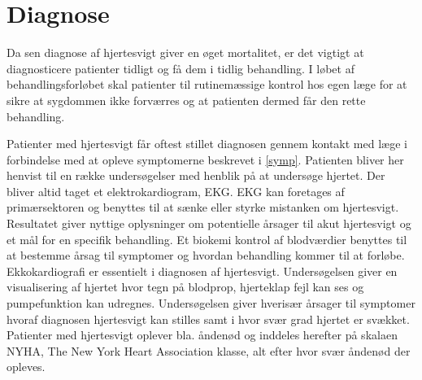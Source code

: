 

\section{Diagnose}
Da sen diagnose af hjertesvigt giver en øget mortalitet, er det vigtigt at diagnosticere patienter tidligt og få dem i tidlig behandling. I løbet af behandlingsforløbet skal patienter til rutinemæssige kontrol hos egen læge for at sikre at sygdommen ikke forværres og at patienten dermed får den rette behandling. \cite{heartfailure}

Patienter med hjertesvigt får oftest stillet diagnosen gennem kontakt med læge i forbindelse med at opleve symptomerne beskrevet i \autoref{symp}. Patienten bliver her henvist til en række undersøgelser med henblik på at undersøge hjertet. \cite{heartfailure}
Der bliver altid taget et elektrokardiogram, EKG. EKG kan foretages af primærsektoren og benyttes til at sænke eller styrke mistanken om hjertesvigt. Resultatet giver nyttige oplysninger om potentielle årsager til akut hjertesvigt og et mål for en specifik behandling. Et biokemi kontrol af blodværdier benyttes til at bestemme årsag til symptomer og hvordan behandling kommer til at forløbe. \cite{DCS}
Ekkokardiografi er essentielt i diagnosen af hjertesvigt. Undersøgelsen giver en visualisering af hjertet hvor tegn på blodprop, hjerteklap fejl kan ses og pumpefunktion kan udregnes. \cite{heartfailure}\cite{DCS}
Undersøgelsen giver hverisær årsager til symptomer hvoraf diagnosen hjertesvigt kan stilles samt i hvor svær grad hjertet er svækket. Patienter med hjertesvigt oplever bla. åndenød og inddeles herefter på skalaen NYHA, The New York Heart Association klasse, alt efter hvor svær åndenød der opleves. \cite{heartfailure}\cite{DCS}


